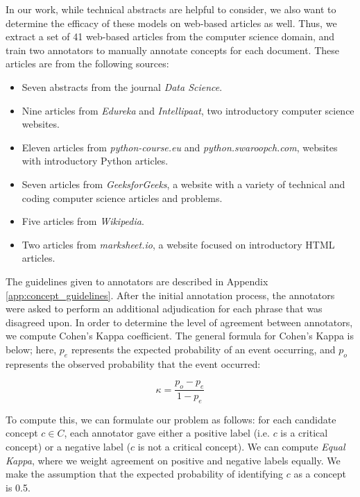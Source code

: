 \documentclass[thesis.tex]{subfiles}
\begin{document}
In our work, while technical abstracts are helpful to consider, we also want to determine the efficacy of these models on web-based articles as well. Thus, we extract a set of 41 web-based articles from the computer science domain, and train two annotators to manually annotate concepts for each document. These articles are from the following sources:

\begin{itemize}
\setlength\itemsep{-1em}
\item Seven abstracts from the journal \textit{Data Science}.
\item Nine articles from \textit{Edureka} and \textit{Intellipaat}, two introductory computer science websites.
\item Eleven articles from \textit{python-course.eu} and  \textit{python.swaroopch.com}, websites with introductory Python articles.
\item Seven articles from \textit{GeeksforGeeks}, a website with a variety of technical and coding computer science articles and problems.
\item Five articles from \textit{Wikipedia}.
\item Two articles from \textit{marksheet.io}, a website focused on introductory HTML articles.
\end{itemize}

The guidelines given to annotators are described in Appendix \ref{app:concept_guidelines}. After the initial annotation process, the annotators were asked to perform an additional adjudication for each phrase that was disagreed upon. In order to determine the level of agreement between annotators, we compute Cohen's Kappa coefficient. The general formula for Cohen's Kappa is below; here, $p_e$ represents the expected probability of an event occurring, and $p_o$ represents the observed probability that the event occurred:

\begin{equation}
\kappa = \frac{p_o - p_e}{1 - p_e}
\end{equation}

To compute this, we can formulate our problem as follows: for each candidate concept $c \in C$, each annotator gave either a positive label (i.e. $c$ is a critical concept) or a negative label ($c$ is not a critical concept). We can compute \textit{Equal Kappa}, where we weight agreement on positive and negative labels equally. We make the assumption that the expected probability of identifying $c$ as a concept is 0.5.
\end{document}
